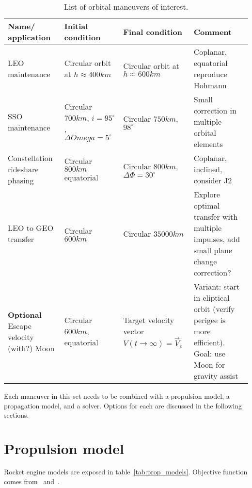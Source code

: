 \begin{table}[htpb]
    \centering
    \begin{tabular}{>{\centering\arraybackslash}m{3cm}>{\centering\arraybackslash}m{3cm}>{\centering\arraybackslash}m{3cm}>{\centering\arraybackslash}m{3cm}}\toprule
        \textbf{Name/ application} & \textbf{Initial condition} & \textbf{Final condition} & \textbf{Comment}\\ \midrule
        LEO maintenance & Circular orbit at \(h \approx 400km\) & 
        Circular orbit at \(h \approx 600km\) & Coplanar, equatorial reproduce Hohmann \\ \midrule

        SSO maintenance & Circular \(700km\), \(i=95^\circ\), \(\Delta Omega = 5^\circ\) & Circular \(750km\), \(98^\circ \) & Small correction in multiple orbital elements \\ \midrule
        
        Constellation rideshare phasing & Circular \(800km\)equatorial & Circular \(800km\), \(\Delta \Phi = 30^\circ\) & Coplanar, inclined, consider J2 \\ \midrule
        
        LEO to GEO transfer & Circular \(600km\) & Circular \(35000km\) & Explore optimal transfer with multiple impulses, add small plane change correction? \\ \midrule
        
        \textbf{Optional} Escape velocity (with?) Moon & Circular \(600km\), equatorial & Target velocity vector \(V(t \rightarrow \infty) = \vec{V}_e\) & Variant: start in eliptical orbit (verify perigee is more efficient). Goal: use Moon for gravity assist \\ \bottomrule
    \end{tabular}
    \caption{List of orbital maneuvers of interest.}\label{tab:man_interest}
\end{table}

Each maneuver in this set needs to be combined with a propulsion model, a propagation model, and a solver. Options for each are discussed in the following sections.

\newpage
\section{Propulsion model}

Rocket engine models are exposed in table~\ref{tab:prop_models}. Objective function comes from~\cite{Conway_2010} and~\cite{sandro_quasi_circ}.

